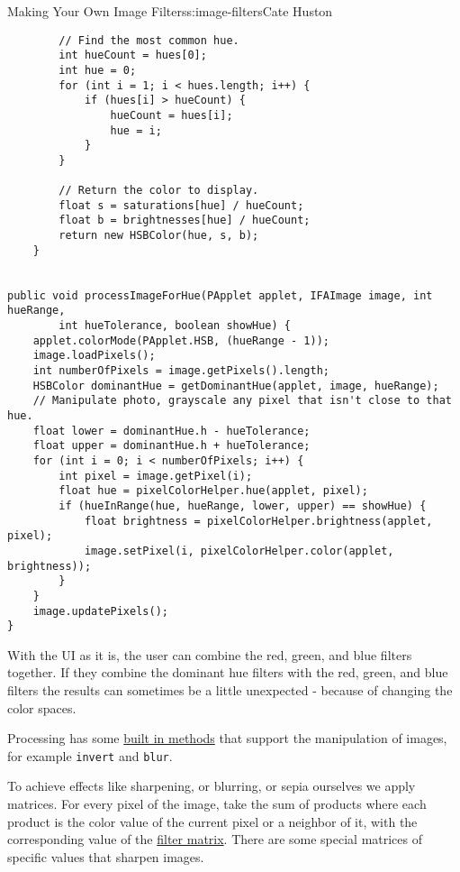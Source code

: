 \begin{aosachapter}{Making Your Own Image Filters}{s:image-filters}{Cate Huston}
\begin{verbatim}
        // Find the most common hue.
        int hueCount = hues[0];
        int hue = 0;
        for (int i = 1; i < hues.length; i++) {
            if (hues[i] > hueCount) {
                hueCount = hues[i];
                hue = i;
            }
        }

        // Return the color to display.
        float s = saturations[hue] / hueCount;
        float b = brightnesses[hue] / hueCount;
        return new HSBColor(hue, s, b);
    }


public void processImageForHue(PApplet applet, IFAImage image, int hueRange,
        int hueTolerance, boolean showHue) {
    applet.colorMode(PApplet.HSB, (hueRange - 1));
    image.loadPixels();
    int numberOfPixels = image.getPixels().length;
    HSBColor dominantHue = getDominantHue(applet, image, hueRange);
    // Manipulate photo, grayscale any pixel that isn't close to that hue.
    float lower = dominantHue.h - hueTolerance;
    float upper = dominantHue.h + hueTolerance;
    for (int i = 0; i < numberOfPixels; i++) {
        int pixel = image.getPixel(i);
        float hue = pixelColorHelper.hue(applet, pixel);
        if (hueInRange(hue, hueRange, lower, upper) == showHue) {
            float brightness = pixelColorHelper.brightness(applet, pixel);
            image.setPixel(i, pixelColorHelper.color(applet, brightness));
        }
    }
    image.updatePixels();
}
\end{verbatim}

\label{combining-filters}

With the UI as it is, the user can combine the red, green, and blue
filters together. If they combine the dominant hue filters with the red,
green, and blue filters the results can sometimes be a little unexpected
- because of changing the color spaces.

Processing has some
\href{https://www.processing.org/reference/filter_.html}{built in
methods} that support the manipulation of images, for example
\texttt{invert} and \texttt{blur}.

To achieve effects like sharpening, or blurring, or sepia ourselves we
apply matrices. For every pixel of the image, take the sum of products
where each product is the color value of the current pixel or a neighbor
of it, with the corresponding value of the
\href{http://lodev.org/cgtutor/filtering.html}{filter matrix}. There are
some special matrices of specific values that sharpen images.

\label{architecture}


\end{aosachapter}

